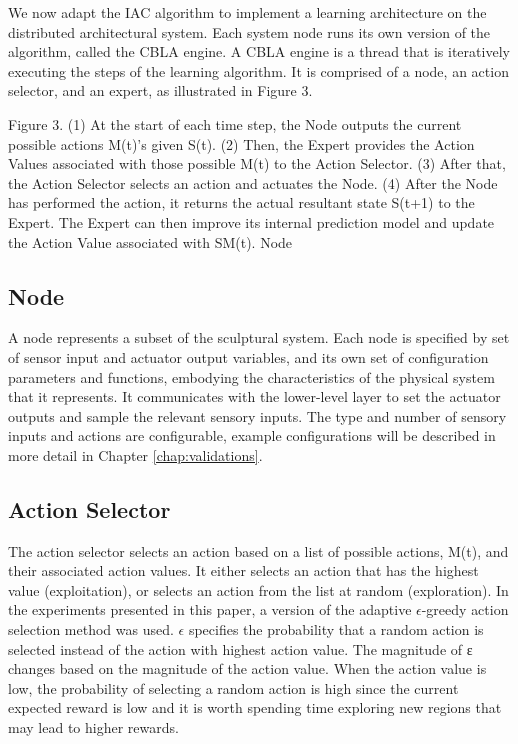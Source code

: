 We now adapt the IAC algorithm \cite{Oudeyer2007} to implement a learning architecture on the distributed architectural system.  Each system node runs its own version of the algorithm, called the CBLA engine.  A CBLA engine is a thread that is iteratively executing the steps of the learning algorithm. It is comprised of a node, an action selector, and an expert, as illustrated in Figure 3. 

Figure 3.	(1) At the start of each time step, the Node outputs the current possible actions M(t)’s given S(t). (2) Then, the Expert provides the Action Values associated with those possible M(t) to the Action Selector. (3) After that, the Action Selector selects an action and actuates the Node. (4) After the Node has performed the action, it returns the actual resultant state S(t+1) to the Expert. The Expert can then improve its internal prediction model and update the Action Value associated with SM(t). 
Node

\subsection{Node}
A node represents a subset of the sculptural system. Each node is specified by set of sensor input and actuator output variables, and its own set of configuration parameters and functions, embodying the characteristics of the physical system that it represents. It communicates with the lower-level layer to set the actuator outputs and sample the relevant sensory inputs.  The type and number of sensory inputs and actions are configurable, example configurations will be described in more detail in Chapter \ref{chap:validations}.

\subsection{Action Selector}

The action selector selects an action based on a list of possible actions, M(t), and their associated action values. It either selects an action that has the highest value (exploitation), or selects an action from the list at random (exploration). In the experiments presented in this paper, a version of the adaptive \(\epsilon\)-greedy \cite{Tokic2010} action selection method was used. \(\epsilon\) specifies the probability that a random action is selected instead of the action with highest action value. The magnitude of ε changes based on the magnitude of the action value. When the action value is low, the probability of selecting a random action is high since the current expected reward is low and it is worth spending time exploring new regions that may lead to higher rewards.

